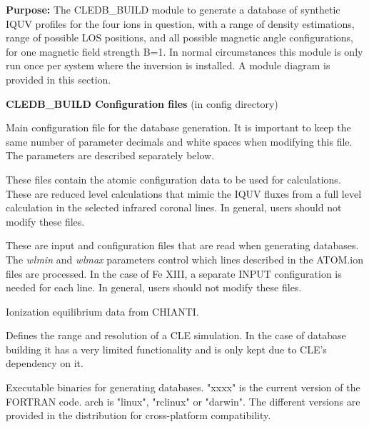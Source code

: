 \documentclass{article}
\begin{document}
\textbf{Purpose:} The CLEDB\_BUILD module to generate a database of synthetic IQUV profiles for the four ions in question, with a range of density estimations, range of possible LOS positions, and all possible magnetic angle configurations, for one magnetic field strength B=1.  In normal circumstances this module is only run once per system where the inversion is installed. A module diagram is provided in this section.

\textbf{CLEDB\_BUILD Configuration files} (in config directory)
\begin{description}
    [font=\normalfont,leftmargin=1.3in,style=multiline]
	\item[DB.INPUT]
	Main configuration file for the database generation. It is important to keep the same number of parameter decimals and white spaces when modifying this file. The parameters are described separately below. 
    \item[ATOM.ion]
    	These files contain the atomic configuration data to be used for calculations. These are reduced level calculations that mimic the IQUV fluxes from a full level calculation in the selected infrared coronal lines. In general, users should not modify these files.
	\item[INPUT.ion(a/b)]
	These are input and configuration files that are read when generating databases. The \emph{wlmin} and \emph{wlmax} parameters control which lines described in the ATOM.ion files are processed. In the case of Fe XIII, a separate INPUT configuration is needed for each line. In general, users should not modify these files.   
	\item[IONEQ]
	Ionization equilibrium data from CHIANTI.
	\item[GRID.DAT]
	Defines the range and resolution of a CLE simulation. In the case of database building it has a very limited functionality and is only kept due to CLE's dependency on it.
	\item[db"xxxx"\_"arch"]
	Executable binaries for generating databases. "xxxx" is the current version of the FORTRAN code. arch is "linux", "rclinux" or "darwin". The different versions are provided in the distribution for cross-platform compatibility.	
\end{description}
    
\end{document}
